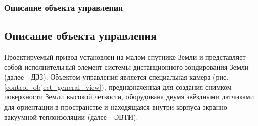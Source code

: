 \idefined{\DIPLOMA}
    \subsubsection{Описание объекта управления}
\else
    \subsection{Описание объекта управления}
\fi

Проектируемый привод установлен на малом спутнике Земли и представляет собой
исполнительный элемент системы дистанционного зондирования Земли (далее - ДЗЗ).
Объектом управления является специальная камера (рис. \ref{control_object_general_view}),
предназначенная для создания снимком поверхности Земли высокой четкости,
оборудована двумя звёздными датчиками для ориентации в пространстве и
находящаяся внутри корпуса экранно-вакуумной теплоизоляции (далее - ЭВТИ).

